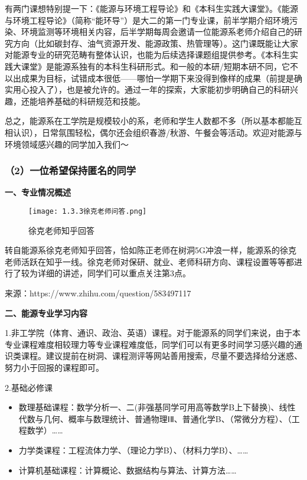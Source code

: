 \documentclass[11pt,oneside]{book}
\begin{document}
\vspace{10pt}

有两门课想特别提一下：《能源与环境工程导论》和《本科生实践大课堂》。《能源与环境工程导论》（简称“能环导”）是大二的第一门专业课，前半学期介绍环境污染、环境监测等环境相关内容，后半学期每周会邀请一位能源系老师介绍自己的研究方向（比如碳封存、油气资源开发、能源政策、热管理等）。这门课既能让大家对能源专业的研究范畴有整体认识，也能为后续选择课题组提供参考。《本科生实践大课堂》是能源系独有的本科生科研形式。和一般的本研/短期本研不同，它不以出成果为目标，试错成本很低——哪怕一学期下来没得到像样的成果（前提是确实用心投入了），也是被允许的。通过一年的探索，大家能初步明确自己的科研兴趣，还能培养基础的科研规范和技能。

\vspace{10pt}

总之，能源系在工学院是规模较小的系，老师和学生人数都不多（所以基本都能互相认识），日常氛围轻松，偶尔还会组织春游/秋游、午餐会等活动。欢迎对能源与环境领域感兴趣的同学加入我们～

\subsubsection{（2）一位希望保持匿名的同学}
\textbf{一、专业情况概述}

\begin{figure}[htbp]
    \centering
    \texttt{[image: 1.3.3徐克老师问答.png]}
    \renewcommand{\figurename}{图}
    \caption{徐克老师知乎回答}
    \label{fig:enter-label}
\end{figure}

转自能源系徐克老师知乎回答，恰如陈正老师在树洞5G冲浪一样，能源系的徐克老师活跃在知乎一线。徐克老师对保研、就业、老师科研方向、课程设置等等都进行了较为详细的讲述，同学们可以重点关注第3点。

来源：https://www.zhihu.com/question/583497117

\vspace{10pt}

\textbf{二、能源专业学习内容}

1.非工学院（体育、通识、政治、英语）课程。对于能源系的同学们来说，由于本专业课程难度相较理力等专业课程难度低，同学们可以有更多时间学习感兴趣的通识类课程。建议提前在树洞、课程测评等网站善用搜索，尽量不要选择给分迷惑、努力小于回报的课程即可。

\vspace{10pt}

2.基础必修课

\begin{itemize}
    \item 数理基础课程：数学分析一、二(非强基同学可用高等数学B上下替换)、线性代数与几何、概率与数理统计、普通物理ⅠⅡ、普通化学B、（常微分方程）、（工程数学）……

    \item 力学类课程：工程流体力学、（理论力学B）、（材料力学B）、……

    \item 计算机基础课程：计算概论、数据结构与算法、计算方法……

\end{itemize}
\end{document}
